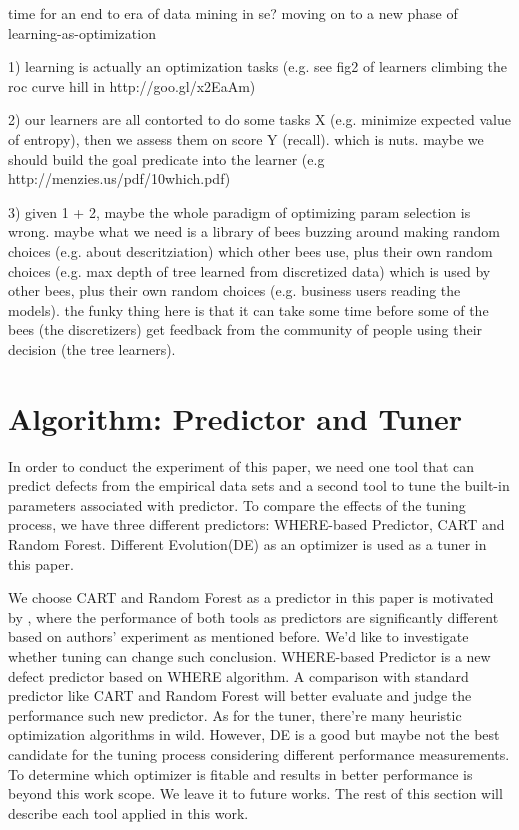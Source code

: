 \documentclass{sig-alternative}
\begin{document}
time for an end to era of data mining in se? moving on to a new phase of learning-as-optimization

1) learning is actually an optimization tasks (e.g. see fig2 of  learners climbing the roc curve hill in http://goo.gl/x2EaAm)

2) our learners are all contorted to do some tasks X (e.g. minimize expected value of entropy), then we assess them on score Y (recall). which is nuts. maybe we should build the goal predicate into the learner (e.g http://menzies.us/pdf/10which.pdf) 

3) given 1 + 2, maybe the whole paradigm of optimizing param selection is wrong. maybe what we need is a library of bees buzzing around making random choices (e.g. about descritziation) which other bees use, plus their own random choices (e.g. max depth of tree learned from discretized data) which is used by other bees, plus their own random choices (e.g. business users reading the models).  the funky thing here is that it can take some time before some of the bees (the discretizers) get feedback from the community of people using their decision (the tree learners). 

\section{Algorithm: Predictor and Tuner}

In order to conduct the experiment of this paper, we need one tool that can predict defects 
from the empirical data sets and a second tool to tune the built-in parameters associated with 
predictor. To compare the effects of the tuning process, we have three different predictors: 
WHERE-based Predictor, CART and Random Forest. Different Evolution(DE) as an optimizer 
is used as a tuner in this paper.

We choose CART and Random Forest as a predictor in this paper is motivated by 
\cite{lessmann2008benchmarking}, where the performance of both tools as predictors are 
significantly different based on authors' experiment as mentioned before. We'd like to 
investigate whether tuning can change such conclusion. WHERE-based Predictor is a new 
defect predictor based on WHERE\cite{menzies2013local} algorithm. A comparison with 
standard predictor like CART and Random Forest will better evaluate and judge the 
performance such new predictor. As for the tuner, there're many heuristic optimization 
algorithms in wild. However, DE is a good but maybe not the best candidate for the tuning 
process considering different performance measurements. To determine which optimizer is 
fitable and results in better performance is beyond this work scope. We leave it to future 
works. The rest of this section will describe each tool applied in this work.
\end{document}
